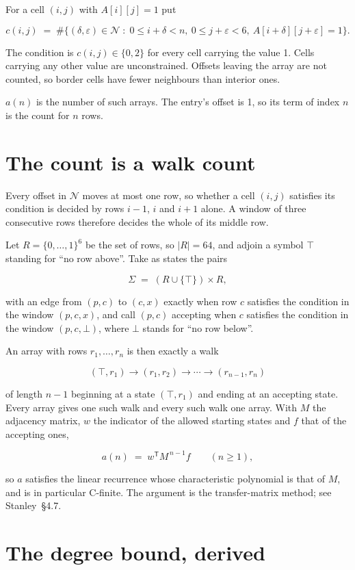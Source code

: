 \documentclass[11pt]{article}
\theoremstyle{definition}
\begin{document}
For a cell $(i,j)$ with $A[i][j] = 1$ put

\[c(i,j) \;=\; \#\bigl\{(\delta,\varepsilon)\in\mathcal{N} \;:\; 0\le i+\delta<n,\ 0\le j+\varepsilon<6,\ A[i+\delta][j+\varepsilon] = 1\bigr\}.\]

The condition is $c(i,j) \in \{0, 2\}$ for every cell carrying the value 1. Cells carrying any other value are unconstrained. Offsets leaving the array are not counted, so border cells have fewer neighbours than interior ones.

$a(n)$ is the number of such arrays. The entry's offset is 1, so its term of index $n$ is the count for $n$ rows.

\section{The count is a walk count}

Every offset in $\mathcal{N}$ moves at most one row, so whether a cell $(i,j)$ satisfies its condition is decided by rows $i-1$, $i$ and $i+1$ alone. A window of three consecutive rows therefore decides the whole of its middle row.

Let $R = \{0,\dots,1\}^{6}$ be the set of rows, so $|R| = 64$, and adjoin a symbol $\top$ standing for ``no row above''. Take as states the pairs

\[\Sigma \;=\; (R \cup \{\top\}) \times R,\]

with an edge from $(p,c)$ to $(c,x)$ exactly when row $c$ satisfies the condition in the window $(p,c,x)$, and call $(p,c)$ accepting when $c$ satisfies the condition in the window $(p,c,\bot)$, where $\bot$ stands for ``no row below''.

An array with rows $r_1,\dots,r_n$ is then exactly a walk

\[(\top,r_1) \to (r_1,r_2) \to \cdots \to (r_{n-1},r_n)\]

of length $n-1$ beginning at a state $(\top,r_1)$ and ending at an accepting state. Every array gives one such walk and every such walk one array. With $M$ the adjacency matrix, $w$ the indicator of the allowed starting states and $f$ that of the accepting ones,

\[a(n) \;=\; w^{\mathsf T} M^{\,n-1} f \qquad (n \ge 1),\]

so $a$ satisfies the linear recurrence whose characteristic polynomial is that of $M$, and is in particular C-finite. The argument is the transfer-matrix method; see Stanley~\S4.7.

\section{The degree bound, derived}
\end{document}
